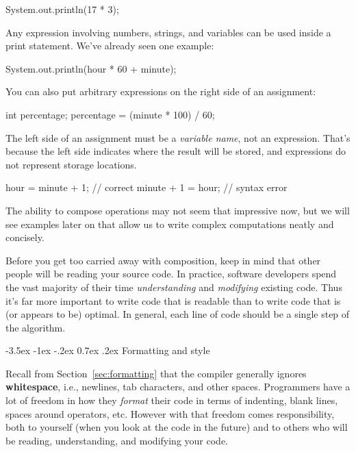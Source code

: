 \documentclass[12pt]{book}
\makeatletter
\renewcommand{\section}{\@startsection {section}{1}{\z@}%
    {-3.5ex \@plus -1ex \@minus -.2ex}%
    {0.7ex \@plus.2ex}%
    {\normalfont\Large\bfseries}}
\theoremstyle{exercise}
\makeatother
\begin{document}
\begin{code}
    System.out.println(17 * 3);
\end{code}

Any expression involving numbers, strings, and variables can be used inside a print statement.
We've already seen one example:

\begin{code}
    System.out.println(hour * 60 + minute);
\end{code}

You can also put arbitrary expressions on the right side of an assignment:

\begin{code}
    int percentage;
    percentage = (minute * 100) / 60;
\end{code}

The left side of an assignment must be a {\em variable name}, not an expression.
That's because the left side indicates where the result will be stored,
and expressions do not represent storage locations.

\begin{code}
    hour = minute + 1;  // correct
    minute + 1 = hour;  // syntax error
\end{code}


The ability to compose operations may not seem that impressive now, but we will see examples later on that allow us to write complex computations neatly and concisely.

Before you get too carried away with composition, keep in mind that other people will be reading your source code.
In practice, software developers spend the vast majority of their time {\em understanding} and {\em modifying} existing code.
Thus it's far more important to write code that is readable than to write code that is (or appears to be) optimal.
In general, each line of code should be a single step of the algorithm.


\section{Formatting and style}


Recall from Section~\ref{sec:formatting} that the compiler generally ignores {\bf whitespace}, i.e., newlines, tab characters, and other spaces.
Programmers have a lot of freedom in how they {\em format} their code in terms of indenting, blank lines, spaces around operators, etc.
However with that freedom comes responsibility, both to yourself (when you look at the code in the future) and to others who will be reading, understanding, and modifying your code.
\end{document}
